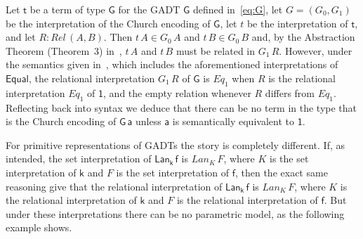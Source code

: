 \documentclass[acmsmall,screen,review,anonymous]{acmart}
\theoremstyle{definition}
\begin{document}
\begin{example}\label{ex:CE-par}
Let $\mathsf{t}$ be a term of type $\mathsf{G}$ for the GADT
$\mathsf{G}$ defined in~\eqref{eq:G}, let $G = (G_0,G_1)$ be the
interpretation of the Church encoding of $\mathsf{G}$, let $t$ be the
interpretation of $\mathsf{t}$, and let $R :
\mathit{Rel}\,(A,B)$. Then $t\, A \in G_0\,A$ and $t\,B \in G_0\,B$
and, by the Abstraction Theorem (Theorem~3) in~\cite{atk12}, $t\,A$
and $t\,B$ must be related in $G_1\,R$. However, under the semantics
given in~\cite{atk12}, which includes the aforementioned
interpretations of $\mathsf{Equal}$, the relational interpretation
$G_1\,R$ of $\mathsf{G}$ is $\mathit{Eq}_1$ when $R$ is the relational
interpretation $\mathit{Eq}_1$ of $\mathsf{1}$, and the empty relation
whenever $R$ differs from $\mathit{Eq}_1$. Reflecting back into syntax
we deduce that there can be no term in the type that is the Church
encoding of $\mathsf{G\,a}$ unless $\mathsf{a}$ is semantically
equivalent to $\mathsf{1}$.
\end{example}

For primitive representations of GADTs the story is completely
different. If, as intended, the set interpretation of
$\mathsf{Lan_k\,f}$ is $\mathit{Lan}_K\,F$, where $K$ is the set
interpretation of $\mathsf{k}$ and $F$ is the set interpretation of
$\mathsf{f}$, then the exact same reasoning give that the relational
interpretation of $\mathsf{Lan_k\,f}$ is $\mathit{Lan}_K\,F$, where
$K$ is the relational interpretation of $\mathsf{k}$ and $F$ is the
relational interpretation of $\mathsf{f}$. But under these
interpretations there can be no parametric model, as the following
example shows.
\end{document}
